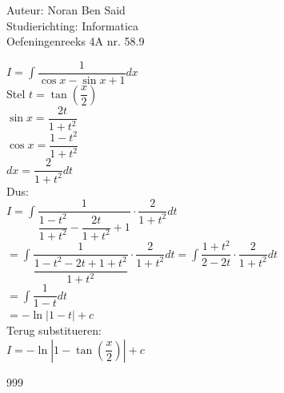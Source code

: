 \documentclass[a4paper]{article}
\begin{document}
\noindent \large Auteur: Noran Ben Said \\
\noindent \large Studierichting:  Informatica\\
\noindent \large Oefeningenreeks 4A nr. 58.9\\

\medskip

\normalsize

$ I = \displaystyle\int \dfrac{1}{\cos x-\sin x+1}dx$\\

Stel $ t=\tan\left(\dfrac{x}{2}\right)$\\

$ \sin x=\dfrac{2t}{1+t^2}$\\

$ \cos x=\dfrac{1-t^2}{1+t^2}$\\

$ dx=\dfrac{2}{1+t^2}dt$\\

Dus:\\

$ I=\displaystyle\int\dfrac{1}{\dfrac{1-t^2}{1+t^2}-\dfrac{2t}{1+t^2}+1}\cdot \dfrac{2}{1+t^2}dt$\\

$ =\displaystyle\int\dfrac{1}{\dfrac{1-t^2-2t+1+t^2}{1+t^2}}\cdot\dfrac{2}{1+t^2}dt=\displaystyle\int\dfrac{1+t^2}{2-2t}\cdot\dfrac{2}{1+t^2}dt$\\

$ =\displaystyle\int\dfrac{1}{1-t}dt$\\

$ =-\ln|1-t|+c$\\

Terug substitueren:\\

$ I=-\ln\left|1-\tan\left(\dfrac{x}{2}\right)\right|+c$\\

\begin{thebibliography}{999}
\end{thebibliography}
\end{document}

